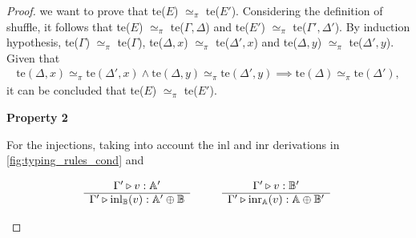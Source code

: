 \documentclass[10pt,a4paper]{amsart}
\theoremstyle{definition}
\theoremstyle{definition}
\theoremstyle{definition}
\theoremstyle{definition}
\theoremstyle{definition}
\theoremstyle{definition}
\begin{document}
\begin{proof}
we want to prove that te($E$) $\simeq_{\pi}$  te($E'$). Considering the definition of shuffle, it follows that  te($E$) $\simeq_{\pi}$  te($\Gamma, \Delta$) and te($E'$) $\simeq_{\pi}$  te($\Gamma', \Delta'$). By induction hypothesis, te($\Gamma$) $\simeq_{\pi}$  te($\Gamma$), te($\Delta,x$) $\simeq_{\pi}$  te($\Delta',x$) and te($\Delta,y$) $\simeq_{\pi}$  te($\Delta',y$). Given that 
\begin{align*}
     \text{te}(\Delta,x) \simeq_{\pi}  \text{te}(\Delta',x) \land \text{te}(\Delta,y) \simeq_{\pi}  \text{te}(\Delta',y) 
    \implies \text{te}(\Delta) \simeq_{\pi}  \text{te}(\Delta'), 
  \end{align*}
 it can be concluded that te($E$) $\simeq_{\pi}$  te($E'$).




\vspace{10pt}
\textbf{Property 2}

For the injections, taking into account the inl and inr derivations in \autoref{fig:typing_rules_cond} and

\begin{figure} [H]
  \begin{equation*}
  \begin{split}
  \begin{aligned}
  & \hspace{15pt}
  \begin{minipage}[t]{0.3\textwidth}
  $\begin{array}{c}
     \Gamma' \triangleright v: \mathbb{A'} \\
    \hline
   \Gamma' \triangleright \text{inl}_{\mathbb{B}}(v):  \mathbb{A'} \oplus \mathbb{B}
\end{array}
$
  \end{minipage} 
 \hspace{20pt}
\begin{minipage}[t]{0.3\textwidth}
$\begin{array}{c}
      \Gamma' \triangleright v:  \mathbb{B'} \\
    \hline
   \Gamma' \triangleright \text{inr}_{\mathbb{A}}(v): \mathbb{A} \oplus \mathbb{B'}
\end{array}
$ \end{minipage}
  \end{aligned}
  \end{split}
  \end{equation*}
  \end{figure}


\end{proof}
\end{document}

